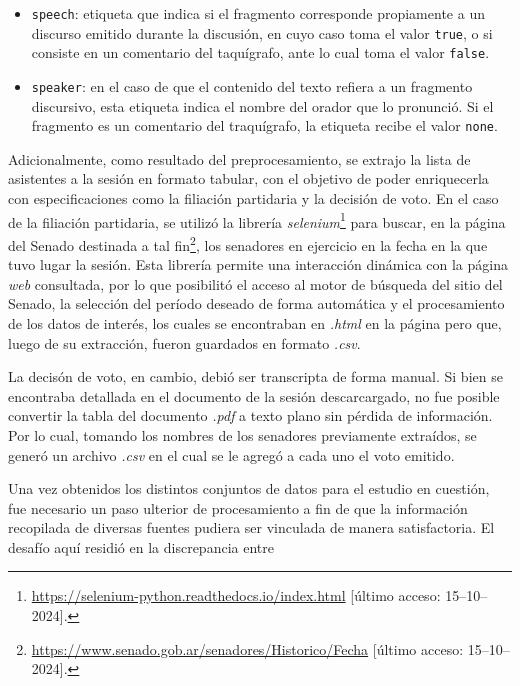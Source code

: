 \begin{itemize}
    \item \texttt{speech}: etiqueta que indica si el fragmento corresponde
    propiamente a un discurso emitido durante la discusi\'on, en cuyo caso toma el
    valor \texttt{true}, o si consiste en un comentario del taqu\'igrafo, ante lo cual
    toma el valor \texttt{false}.
    \item \texttt{speaker}: en el caso de que el contenido del texto refiera a
    un fragmento discursivo, esta etiqueta indica el nombre del orador que lo
    pronunci\'o. Si el fragmento es un comentario del traqu\'igrafo, la etiqueta
    recibe el valor \texttt{none}.
\end{itemize}
\par
Adicionalmente, como resultado del preprocesamiento, se extrajo la lista de
asistentes a la sesi\'on en formato tabular, con el objetivo de poder
enriquecerla con especificaciones como la filiaci\'on partidaria y la
decisi\'on de voto. En el caso de la filiaci\'on partidaria, se utiliz\'o la
librer\'ia \textit{selenium}\footnote{\url{https://selenium-python.readthedocs.io/index.html}
[\'ultimo acceso: 15--10--2024].}
para buscar, en la {p\'agina} del Senado destinada a tal
fin\footnote{\url{https://www.senado.gob.ar/senadores/Historico/Fecha}
[\'ultimo acceso: 15--10--2024].},
los senadores en ejercicio en la fecha en la que tuvo lugar la sesi\'on.
Esta librer\'ia permite una interacci\'on din\'amica con la p\'agina \textit{web} consultada,
por lo que posibilit\'o el acceso al motor de b\'usqueda del sitio del Senado, la selecci\'on
del per\'iodo deseado de forma autom\'atica y el procesamiento de los datos de inter\'es,
los cuales se encontraban en \textit{.html} en la p\'agina pero que, luego de su
extracci\'on, fueron guardados en formato \textit{.csv}.
\par
La decis\'on de voto, en cambio, debi\'o ser transcripta de forma manual. Si bien
se encontraba detallada en el documento de la sesi\'on descarcargado, no fue posible
convertir la tabla del documento \textit{.pdf} a texto plano sin p\'erdida de informaci\'on.
Por lo cual, tomando los nombres de los senadores previamente extra\'idos, se gener\'o
un archivo \textit{.csv} en el cual se le agreg\'o a cada uno el voto emitido.
\par
Una vez obtenidos los distintos conjuntos de datos para el estudio en cuesti\'on,
fue necesario un paso ulterior de procesamiento a fin de que la informaci\'on
recopilada de diversas fuentes pudiera ser vinculada de manera
satisfactoria. El desaf\'io aqu\'i residi\'o en la discrepancia entre

